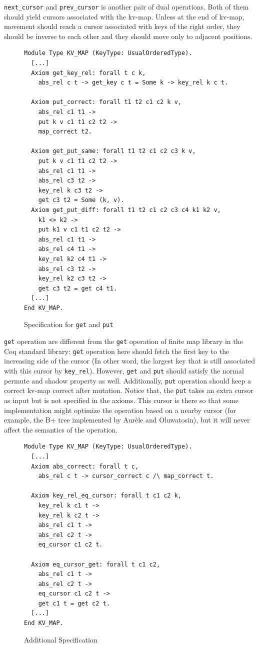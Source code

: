 \documentclass[runningheads]{llncs}
\begin{document}
\texttt{next\_cursor} and \texttt{prev\_cursor} is another pair of dual
operations. Both of them should yield cursors associated with the kv-map. Unless
at the end of kv-map, movement should reach a cursor associated with keys of the
right order, they should be inverse to each other and they should move only to
adjacent positions.

\begin{figure}[htbp]
  \centering
  \begin{verbatim}
Module Type KV_MAP (KeyType: UsualOrderedType).
  [...]
  Axiom get_key_rel: forall t c k,
    abs_rel c t -> get_key c t = Some k -> key_rel k c t.

  Axiom put_correct: forall t1 t2 c1 c2 k v,
    abs_rel c1 t1 ->
    put k v c1 t1 c2 t2 ->
    map_correct t2.

  Axiom get_put_same: forall t1 t2 c1 c2 c3 k v,
    put k v c1 t1 c2 t2 ->
    abs_rel c1 t1 ->
    abs_rel c3 t2 ->
    key_rel k c3 t2 ->
    get c3 t2 = Some (k, v).
  Axiom get_put_diff: forall t1 t2 c1 c2 c3 c4 k1 k2 v,
    k1 <> k2 ->
    put k1 v c1 t1 c2 t2 ->
    abs_rel c1 t1 ->
    abs_rel c4 t1 ->
    key_rel k2 c4 t1 ->
    abs_rel c3 t2 ->
    key_rel k2 c3 t2 ->
    get c3 t2 = get c4 t1.
  [...]
End KV_MAP.
\end{verbatim}
  \caption{Specification for \texttt{get} and \texttt{put}}\label{fig:get_put}
\end{figure}

\texttt{get} operation are different from the \texttt{get} operation of finite
map library in the Coq standard library: \texttt{get} operation here should
fetch the first key to the increasing side of the cursor (In other word, the
largest key that is still associated with this cursor by \texttt{key\_rel}).
However, \texttt{get} and \texttt{put} should satisfy the normal permute and
shadow property as well. Additionally, \texttt{put} operation should keep a
correct kv-map correct after mutation. Notice that, the \texttt{put} takes an
extra cursor as input but is not specified in the axioms. This cursor is there
so that some implementation might optimize the operation based on a nearby
cursor (for example, the B+ tree implemented by Aur\`ele and Oluwatosin), but it
will never affect the semantics of the operation.

\begin{figure}[htbp]
  \centering
  \begin{verbatim}
Module Type KV_MAP (KeyType: UsualOrderedType).
  [...]
  Axiom abs_correct: forall t c,
    abs_rel c t -> cursor_correct c /\ map_correct t.

  Axiom key_rel_eq_cursor: forall t c1 c2 k,
    key_rel k c1 t ->
    key_rel k c2 t ->
    abs_rel c1 t ->
    abs_rel c2 t ->
    eq_cursor c1 c2 t.

  Axiom eq_cursor_get: forall t c1 c2,
    abs_rel c1 t ->
    abs_rel c2 t ->
    eq_cursor c1 c2 t ->
    get c1 t = get c2 t.
  [...]
End KV_MAP.
\end{verbatim}
  \caption{Additional Specification}\label{fig:aux_spec}
\end{figure}
\end{document}
